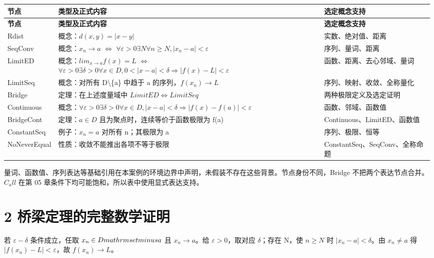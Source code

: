\documentclass[UTF8,a4paper,zihao=-4,fontset=windows,openany]{ctexbook}
\def\mathrm#1{#1}%
\begin{document}
\begingroup\small\setlength{\tabcolsep}{4pt}
\begin{longtable}{>{\raggedright\arraybackslash}p{}>{\raggedright\arraybackslash}p{}>{\raggedright\arraybackslash}p{}}
\toprule
\textbf{节点} & \textbf{类型及正式内容} & \textbf{选定概念支持} \\
\midrule
\endfirsthead
\toprule
\textbf{节点} & \textbf{类型及正式内容} & \textbf{选定概念支持} \\
\midrule
\endhead
\bottomrule
\endfoot
\bottomrule
\endlastfoot
Rdist & 概念：\(d(x,y)=|x-y|\) & 实数、绝对值、距离 \\
SeqConv & 概念：\(x_n\to a\) \(\Leftrightarrow\) \(\forall\varepsilon>0\exists N\forall n\ge N,|x_n-a|<\varepsilon\) & 序列、量词、距离 \\
LimitED & 概念：\(\mathrm{lim}_{x\to a}f(x)=L\) \(\Leftrightarrow\) \(\forall\varepsilon>0\exists\delta>0\forall x\in D,0<|x-a|<\delta\Rightarrow|f(x)-L|<\varepsilon\) & 函数、距离、去心邻域、量词 \\
LimitSeq & 概念：对所有 D\textbackslash{}\{a\} 中趋于 a 的序列，\(f(x_n)\to L\) & 序列、映射、收敛、全称量化 \\
Bridge & 定理：在上述度量域中 \(\mathrm{LimitED}\Leftrightarrow\mathrm{LimitSeq}\) & 两种极限定义及选定证明 \\
Continuous & 概念：\(\forall\varepsilon>0\exists\delta>0\forall x\in D,|x-a|<\delta\Rightarrow|f(x)-f(a)|<\varepsilon\) & 函数、邻域、函数值 \\
BridgeCont & 定理：\(a\in D\) 且为聚点时，连续等价于函数极限为 f(a) & Continuous、LimitED、函数值 \\
ConstantSeq & 例子：\(x_n=a\) 对所有 n；其极限为 a & 序列、极限、恒等 \\
NoNeverEqual & 性质：收敛不能推出各项不等于极限 & ConstantSeq、SeqConv、全称命题 \\
\end{longtable}
\endgroup

量词、函数值、序列表达等基础引用在本案例的环境边界中声明，未假装不存在这些背景。节点身份不同，Bridge 不把两个表达节点合并。\(C_\mathrm{all}\) 在第 05 章条件下均可能饱和，所以表中使用显式表达支持。

\section{2 桥梁定理的完整数学证明}
若 \(\varepsilon-\delta\) 条件成立，任取 \(x_n\in D\\mathrm{setminus} {a}\) 且 \(x_n\to a\)。给 \(\varepsilon>0\)，取对应 \(\delta\)；存在 N，使 \(n\ge N\) 时 \(|x_n-a|<\delta\)。由 \(x_n\ne a\) 得 \(|f(x_n)-L|<\varepsilon\)，故 \(f(x_n)\to L\)。
\end{document}

